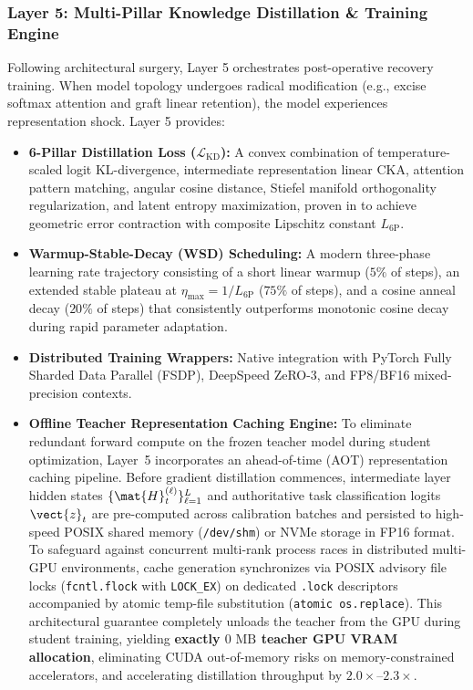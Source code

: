 \subsubsection{Layer 5: Multi-Pillar Knowledge Distillation \& Training Engine}
Following architectural surgery, Layer 5 orchestrates post-operative recovery training. When model topology undergoes radical modification (e.g., excise softmax attention and graft linear retention), the model experiences representation shock. Layer 5 provides:
\begin{itemize}
    \item \textbf{6-Pillar Distillation Loss ($\mathcal{L}_{\text{KD}}$):} A convex combination of temperature-scaled logit KL-divergence, intermediate representation linear CKA, attention pattern matching, angular cosine distance, Stiefel manifold orthogonality regularization, and latent entropy maximization, proven in  to achieve geometric error contraction with composite Lipschitz constant $L_{\text{6P}}$.
    \item \textbf{Warmup-Stable-Decay (WSD) Scheduling:} A modern three-phase learning rate trajectory consisting of a short linear warmup ($5\%$ of steps), an extended stable plateau at $\eta_{\max} = 1/L_{\text{6P}}$ ($75\%$ of steps), and a cosine anneal decay ($20\%$ of steps) that consistently outperforms monotonic cosine decay during rapid parameter adaptation.
    \item \textbf{Distributed Training Wrappers:} Native integration with PyTorch Fully Sharded Data Parallel (FSDP), DeepSpeed ZeRO-3, and FP8/BF16 mixed-precision contexts.
    \item \textbf{Offline Teacher Representation Caching Engine:}
    To eliminate redundant forward compute on the frozen teacher model during student optimization, Layer~5 incorporates an ahead-of-time (AOT) representation caching pipeline. Before gradient distillation commences, intermediate layer hidden states $\{\mat{H}_t^{(\ell)}\}_{\ell=1}^L$ and authoritative task classification logits $\vect{z}_t$ are pre-computed across calibration batches and persisted to high-speed POSIX shared memory (\texttt{/dev/shm}) or NVMe storage in FP16 format. To safeguard against concurrent multi-rank process races in distributed multi-GPU environments, cache generation synchronizes via POSIX advisory file locks (\texttt{fcntl.flock} with \texttt{LOCK\_EX}) on dedicated \texttt{.lock} descriptors accompanied by atomic temp-file substitution (\texttt{atomic os.replace}). This architectural guarantee completely unloads the teacher from the GPU during student training, yielding \textbf{exactly $0\text{ MB}$ teacher GPU VRAM allocation}, eliminating CUDA out-of-memory risks on memory-constrained accelerators, and accelerating distillation throughput by $2.0\times\text{--}2.3\times$.
\end{itemize}

